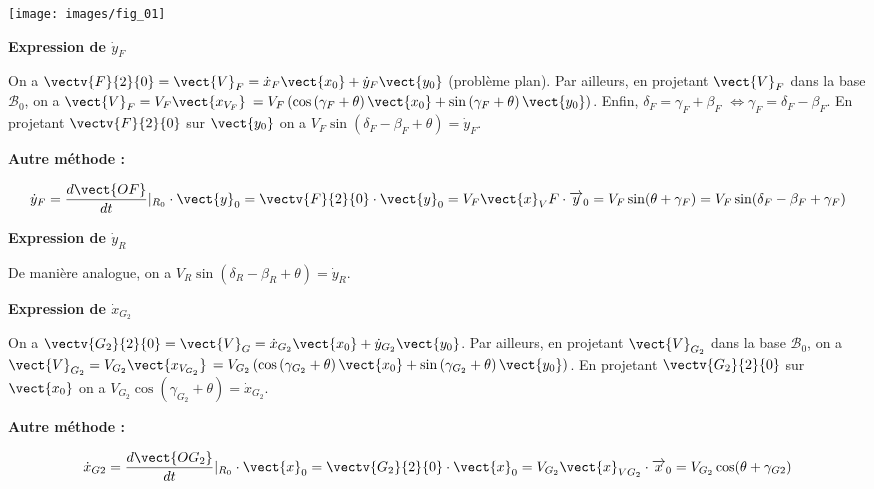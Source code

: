 \documentclass[11pt]{article}
\begin{document}
\begin{UPSTIcorrige}

\begin{center}
\texttt{[image: images/fig\_01]}
\end{center}
\textbf{Expression de $\dot{y}_F$}

On a  $\vectv{F}{2}{0}=\vect{V}_F = \dot{x}_F \vect{x_0} +\dot{y}_F \vect{y_0}$ (problème plan).  
Par ailleurs, en projetant $\vect{V}_F $ dans la base $\mathcal{B}_0$, on a $\vect{V}_F =V_F\vect{x_{V_F}}$ 
$=V_F\left(\cos\left(\gamma_F +\theta \right)\vect{x_0}+\sin\left(\gamma_F +\theta \right)\vect{y_0}\right)$. Enfin, $\delta_F=\gamma_F+\beta_F$ $\Leftrightarrow \gamma_F = \delta_F-\beta_F  $. 
En projetant  $\vectv{F}{2}{0}$ sur $\vect{y_0}$ on a $V_F\sin\left(\delta_F-\beta_F +\theta \right) = \dot{y}_F $.

\textbf{Autre méthode : }

\begin{align*}
\dot{y}_F=\dfrac{d\vect{OF}}{dt}\vert_{R_0}\cdot \vect{y}_0=\vectv{F}{2}{0}\cdot \vect{y}_0=V_F\vect{x}_VF\cdot \overrightarrow{y}_0=V_F\sin(\theta+\gamma_F)=V_F\sin(\delta_F-\beta_F+\gamma_F)
\end{align*}

\textbf{Expression de $\dot{y}_R$}

De manière analogue, on a $V_R \sin\left(\delta_R-\beta_R +\theta \right) = \dot{y}_R $.

\textbf{Expression de $\dot{x}_{G_2}$}

On a  $\vectv{G_2}{2}{0}=\vect{V}_G = \dot{x}_{G_2} \vect{x_0} +\dot{y}_{G_2} \vect{y_0}$.  
Par ailleurs, en projetant $\vect{V}_{G_2} $ dans la base $\mathcal{B}_0$, on a $\vect{V}_{G_2} =V_{G_2}\vect{x_{V_{G_2}}}$ 
$=V_{G_2}\left(\cos\left(\gamma_{G_2} +\theta \right)\vect{x_0}+\sin\left(\gamma_{G_2} +\theta \right)\vect{y_0}\right)$. 
En projetant  $\vectv{{G_2}}{2}{0}$ sur $\vect{x_0}$ on a $V_{G_2}\cos\left(\gamma_{G_2} +\theta \right) = \dot{x}_{G_2} $.


\textbf{Autre méthode : }

\begin{align*}
\dot{x}_{G2}=\dfrac{d\vect{OG_2}}{dt}\vert_{R_0}\cdot \vect{x}_0=\vectv{G_2}{2}{0}\cdot \vect{x}_0=V_{G_2}\vect{x}_{VG_2}\cdot \overrightarrow{x}_0=V_{G_2}\cos(\theta+\gamma_{G2})
\end{align*}

\end{UPSTIcorrige}
\end{document}
